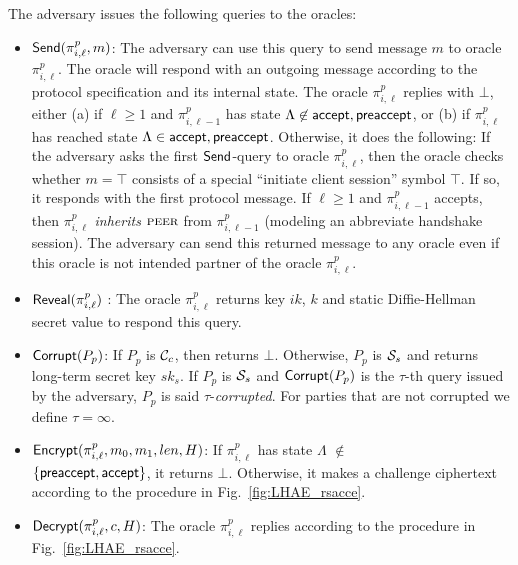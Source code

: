 The adversary issues the following queries to the oracles:
\begin{itemize}
 \item {$\mathsf{Send}(\pi^p_{i, \ell}, m)$:
    The adversary can use this query to send message $m$ to oracle $\pi^p_{i, \ell}$.
    The oracle will respond with an outgoing message according
    to the protocol specification and its internal state.
    The oracle $\pi^p_{i, \ell}$ replies with $\bot$, either
    (a) if $\ell \geq 1$ and $\pi^p_{i, {\ell-1}}$ has state $\Lambda\not\in {\ensuremath{\mathsf{accept}}, \ensuremath{\mathsf{preaccept}}}$,
    or
    (b) if $\pi^p_{i,\ell}$ has reached state $\Lambda\in{\ensuremath{\mathsf{accept}},\ensuremath{\mathsf{preaccept}}}$.
    Otherwise, it does the following:
    If the adversary asks the first $\mathsf{Send}$-query to oracle $\pi^p_{i, \ell}$,
    then the oracle checks whether $m = \top$ consists of a special ``initiate client session'' symbol $\top$.
    If so, it responds with the first protocol message.
    If $\ell \geq 1$ and $\pi^p_{i,\ell-1}$ accepts, then $\pi^p_{i,\ell}$ \textit{inherits} $\textsc{peer}$
    from $\pi^p_{i, \ell-1}$ (modeling an abbreviate handshake session).
    The adversary can send this returned message to any oracle even if this oracle is not intended partner of the oracle $\pi^p_{i, \ell}$.}

 \item {$\mathsf{Reveal}(\pi^p_{i,\ell})$ :
    The oracle $\pi^p_{i,\ell}$ returns key $ik$, $k$ and static Diffie-Hellman secret value to respond this query. }

 \item {$\mathsf{Corrupt}(P_p)$:
    If $P_p$ is $\mathcal{C}_c$, then returns $\bot$. Otherwise, $P_p$ is $\mathcal{S}_s$ and returns
    long-term secret key $sk_s$.
    If $P_p$ is $\mathcal{S}_s$ and $\mathsf{Corrupt}(P_p)$ is the $\tau$-th query issued by the adversary,
    $P_p$ is said $\tau$-\textit{corrupted}.
    For parties that are not corrupted we define $\tau = \infty$.}

 \item {$\mathsf{Encrypt}(\pi^p_{i,\ell}, m_0, m_1, len, H)$:
    If $\pi^p_{i,\ell}$ has state
    $\Lambda$ $\not\in$ \\ $\{\mathsf{preaccept}, \mathsf{accept}\}$, it returns $\bot$.
    Otherwise, it makes a challenge ciphertext according to the procedure in Fig.~\ref{fig:LHAE_rsacce}.}

 \item {$\mathsf{Decrypt}(\pi^p_{i, \ell}, c, H)$:
    The oracle $\pi^p_{i, \ell}$ replies according to the procedure in Fig.~\ref{fig:LHAE_rsacce}.}
\end{itemize}

